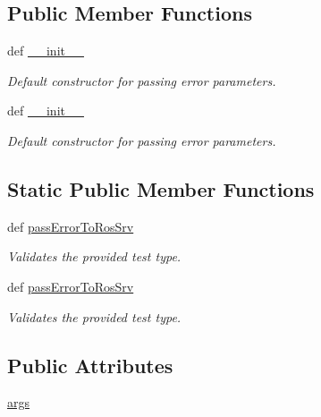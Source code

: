 \subsection*{Public Member Functions}
\begin{DoxyCompactItemize}
\item 
def \hyperlink{classapp__error__exception_1_1AppError_a4652228afbe52312fdc8e9986f7f802e}{\-\_\-\-\_\-init\-\_\-\-\_\-}
\begin{DoxyCompactList}\small\item\em Default constructor for passing error parameters. \end{DoxyCompactList}\item 
def \hyperlink{classapp__error__exception_1_1AppError_a4652228afbe52312fdc8e9986f7f802e}{\-\_\-\-\_\-init\-\_\-\-\_\-}
\begin{DoxyCompactList}\small\item\em Default constructor for passing error parameters. \end{DoxyCompactList}\end{DoxyCompactItemize}
\subsection*{Static Public Member Functions}
\begin{DoxyCompactItemize}
\item 
def \hyperlink{classapp__error__exception_1_1AppError_aa1026fe84b63e79d14fd2d38c0b58a04}{pass\-Error\-To\-Ros\-Srv}
\begin{DoxyCompactList}\small\item\em Validates the provided test type. \end{DoxyCompactList}\item 
def \hyperlink{classapp__error__exception_1_1AppError_aa1026fe84b63e79d14fd2d38c0b58a04}{pass\-Error\-To\-Ros\-Srv}
\begin{DoxyCompactList}\small\item\em Validates the provided test type. \end{DoxyCompactList}\end{DoxyCompactItemize}
\subsection*{Public Attributes}
\begin{DoxyCompactItemize}
\item 
\hyperlink{classapp__error__exception_1_1AppError_aabe7dfbe30fe599d7932875373a25c49}{args}
\end{DoxyCompactItemize}


